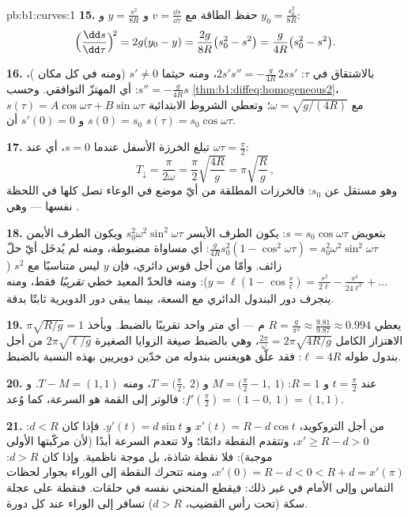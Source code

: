 \begin{solution}{pb:b1:curves:1}
\textbf{15.} حفظ الطاقة مع $v = \frac{\dd s}{\dd\tau}$
و $y = \frac{s^2}{8R}$ و $y_0 = \frac{s_0^2}{8R}$:
\[
\Bigl(\frac{\dd s}{\dd\tau}\Bigr)^{\!2} = 2g(y_0 - y)
= \frac{2g}{8R}\bigl(s_0^2 - s^2\bigr)
= \frac{g}{4R}\bigl(s_0^2 - s^2\bigr).
\]

\textbf{16.} بالاشتقاق في $\tau$: $2s's'' =
-\frac{g}{4R}\,2ss'$، ومنه حيثما $s' \neq 0$ (ومنه في كل مكان
)، $s'' = -\frac{g}{4R}s$: أي المهتزّ التوافقي.
وحسب \cref{thm:b1:diffeq:homogeneous2}، $s(\tau) =
A\cos\omega\tau + B\sin\omega\tau$ مع $\omega =
\sqrt{g/(4R)}$؛ وتعطي الشروط الابتدائية $s(0) = s_0$ و $s'(0) = 0$
أن $s(\tau) = s_0\cos\omega\tau$.

\textbf{17.} تبلغ الخرزة الأسفل عندما $s = 0$، أي عند
$\omega\tau = \frac\pi2$:
\[
T_{\downarrow} = \frac{\pi}{2\omega}
= \frac\pi2\sqrt{\frac{4R}{g}} = \pi\sqrt{\frac Rg}\,,
\]
وهو مستقل عن $s_0$: فالخرزات المطلقة من أيّ موضع في الوعاء
تصل كلها في اللحظة نفسها --- وهي .

\textbf{18.} بتعويض $s = s_0\cos\omega\tau$: يكون الطرف الأيسر
$s_0^2\omega^2\sin^2\omega\tau$ ويكون الطرف الأيمن
$\frac{g}{4R}s_0^2(1 - \cos^2\omega\tau) =
s_0^2\omega^2\sin^2\omega\tau$: أي مساواة مضبوطة، ومنه لم يُدخَل أيّ
حلّ زائف. وأمّا من أجل قوس دائري، فإن $y$ ليس
متناسبًا مع $s^2$ ($y = \ell(1 - \cos\frac s\ell) =
\frac{s^2}{2\ell} - \frac{s^4}{24\ell^3} + \dots$): ومنه فالحدّ
المعيد خطي \emph{تقريبًا} فقط، ومنه ينجرف
دور البندول الدائري مع السعة، بينما يبقى
دور الدويرية ثابتًا بدقة.

\textbf{19.} $\pi\sqrt{R/g} = 1$ يعطي $R = \frac{g}{\pi^2}
\approx \frac{9.81}{9.87} \approx 0.994$ م --- أي متر واحد
تقريبًا بالضبط. ويأخذ الاهتزاز الكامل $\frac{2\pi}\omega =
2\pi\sqrt{4R/g}$، وهي بالضبط صيغة الزوايا الصغيرة
$2\pi\sqrt{\ell/g}$ من أجل بندول طوله $\ell = 4R$:
فقد علّق هويغنس بندوله من خدّين دويريين بهذه النسبة
بالضبط.

\textbf{20.} عند $t = \frac\pi2$ و $R = 1$: $M = \bigl(\frac\pi2 -
1,\ 1\bigr)$ و $T = \bigl(\frac\pi2,\ 2\bigr)$، ومنه $T - M = (1,
1)$. و $f'(\frac\pi2) = (1 - 0,\ 1) = (1, 1)$: فالوتر إلى
القمة هو السرعة، كما وُعد.

\textbf{21.} من أجل التروكويد، $x'(t) = R - d\cos t$ و $y'(t)
= d\sin t$. فإذا كان $d < R$: $x' \geq R - d > 0$، وتتقدم النقطة
دائمًا؛ ولا تنعدم السرعة أبدًا (لأن مركّبتها الأولى
موجبة): فلا نقطة شاذة، بل موجة ناظمية. وإذا كان $d > R$: $x'(0)
= R - d < 0 < R + d = x'(\pi)$، ومنه تتحرك النقطة إلى الوراء
بجوار لحظات التماس وإلى الأمام في غير ذلك: فيقطع المنحني
نفسه في حلقات. فنقطة على  عجلة سكة
(تحت رأس القضيب، $d > R$) تسافر إلى الوراء عند كل
دورة.


\end{solution}
